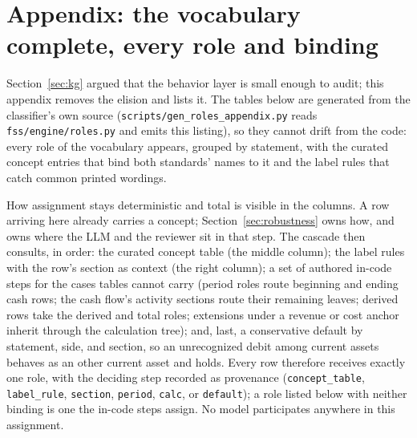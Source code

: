 \documentclass[11pt]{article}
\begin{document}
\begin{figure}[p]
\centering
{}
\end{figure}

\clearpage
\section{Appendix: the vocabulary complete, every role and binding}
\label{app:roles}
Section~\ref{sec:kg} argued that the behavior layer is small enough to audit; this appendix removes the elision and lists it. The tables below are generated from the classifier's own source (\texttt{scripts/\allowbreak gen\_roles\_appendix.py} reads \texttt{fss/engine/roles.py} and emits this listing), so they cannot drift from the code: every role of the vocabulary appears, grouped by statement, with the curated concept entries that bind both standards' names to it and the label rules that catch common printed wordings.

How assignment stays deterministic and total is visible in the columns. A row arriving here already carries a concept; Section~\ref{sec:robustness} owns how, and owns where the LLM and the reviewer sit in that step. The cascade then consults, in order: the curated concept table (the middle column); the label rules with the row's section as context (the right column); a set of authored in-code steps for the cases tables cannot carry (period roles route beginning and ending cash rows; the cash flow's activity sections route their remaining leaves; derived rows take the derived and total roles; extensions under a revenue or cost anchor inherit through the calculation tree); and, last, a conservative default by statement, side, and section, so an unrecognized debit among current assets behaves as an other current asset and holds. Every row therefore receives exactly one role, with the deciding step recorded as provenance (\texttt{concept\_table}, \texttt{label\_rule}, \texttt{section}, \texttt{period}, \texttt{calc}, or \texttt{default}); a role listed below with neither binding is one the in-code steps assign. No model participates anywhere in this assignment.
\end{document}
